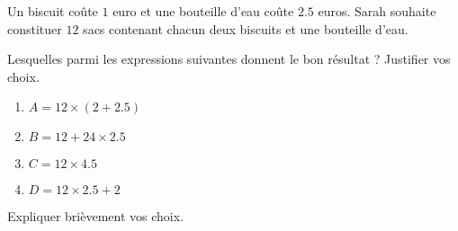 
\begin{exercice}\label{exosmath-0885}

    Un biscuit coûte \( 1\) euro et une bouteille d'eau coûte \( 2.5\) euros. Sarah souhaite constituer \( 12\) sacs contenant chacun deux biscuits et une bouteille d'eau. 

            Lesquelles parmi les expressions suivantes donnent le bon résultat ? Justifier vos choix.
            \begin{enumerate}
                \item
                    \( A=12\times (   2+2.5 )\)
                \item
                    \( B=12+24\times 2.5\)
                \item
                    \( C=12\times 4.5\)
                \item
                    \( D=12\times 2.5+2\)
            \end{enumerate}
    Expliquer brièvement vos choix.

\end{exercice}
